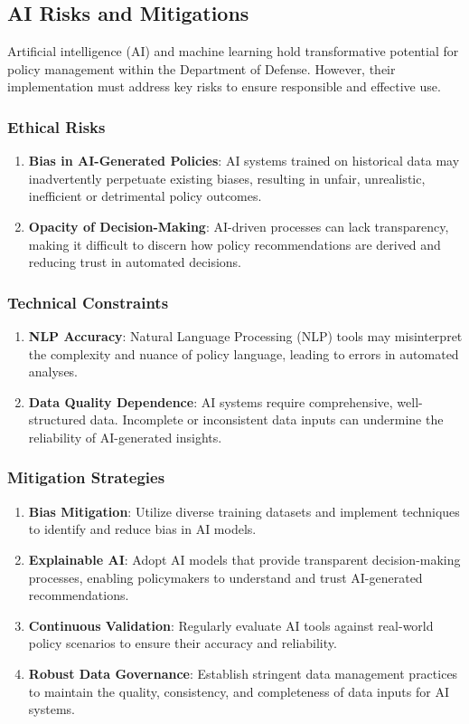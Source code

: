 \documentclass[11pt]{article}
\begin{document}
	\subsection{AI Risks and Mitigations}

	Artificial intelligence (AI) and machine learning hold transformative potential for policy management within the Department of Defense. However, their implementation must address key risks to ensure responsible and effective use.

	\subsubsection{Ethical Risks}
	\begin{enumerate}[label=\arabic*.]
		\item \textbf{Bias in AI-Generated Policies}: AI systems trained on historical data may inadvertently perpetuate existing biases, resulting in unfair, unrealistic, inefficient or detrimental policy outcomes.
		\item \textbf{Opacity of Decision-Making}: AI-driven processes can lack transparency, making it difficult to discern how policy recommendations are derived and reducing trust in automated decisions.
	\end{enumerate}

	\subsubsection{Technical Constraints}
	\begin{enumerate}[label=\arabic*.]
		\item \textbf{NLP Accuracy}: Natural Language Processing (NLP) tools may misinterpret the complexity and nuance of policy language, leading to errors in automated analyses.
		\item \textbf{Data Quality Dependence}: AI systems require comprehensive, well-structured data. Incomplete or inconsistent data inputs can undermine the reliability of AI-generated insights.
	\end{enumerate}

	\subsubsection{Mitigation Strategies}
	\begin{enumerate}[label=\arabic*.]
		\item \textbf{Bias Mitigation}: Utilize diverse training datasets and implement techniques to identify and reduce bias in AI models.
		\item \textbf{Explainable AI}: Adopt AI models that provide transparent decision-making processes, enabling policymakers to understand and trust AI-generated recommendations.
		\item \textbf{Continuous Validation}: Regularly evaluate AI tools against real-world policy scenarios to ensure their accuracy and reliability.
		\item \textbf{Robust Data Governance}: Establish stringent data management practices to maintain the quality, consistency, and completeness of data inputs for AI systems.
	\end{enumerate}
\end{document}

